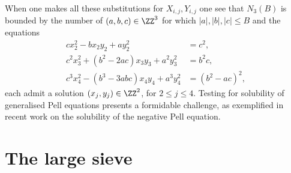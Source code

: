 When one makes all these substitutions for $X_{i,j},Y_{i,j}$ one see that
$N_3(B)$ is bounded by the number of $(a,b,c)\in \ZZ^3$ for which
$|a|,|b|,|c|\leq B$ and the equations
\begin{align*}
cx_{2}^2-bx_{2}y_{2}+ay_{2}^2&=c^2,\\
c^2 x_3^2+(b^2- 2 a c) x_{3} y_3 +a^2 y_{3}^2&= b^2c, \\
c^3x_{4}^2-(b^3-3abc)x_{4}y_{4}+a^3y_{4}^2&= (b^2-ac)^2,
\end{align*}
each admit a solution $(x_j,y_j)\in \ZZ^2$, for $2\leq j\leq 4$. Testing for solubility of generalised Pell equations presents a formidable challenge, as exemplified in recent work \cite{chan, fouvry1, fouvry2, pell} on
the solubility of the negative Pell equation.

\section{The large sieve}

